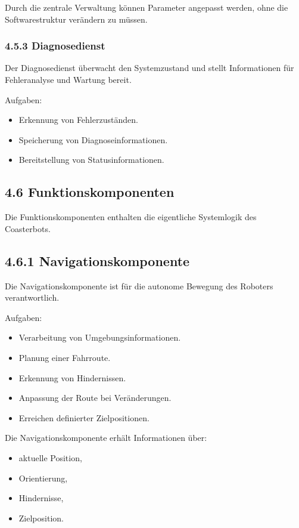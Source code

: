 \documentclass[
  a4paper,
  12pt,
  DIV=12,        %
  parskip=half,  %
  headings=small %
]{scrartcl}
\theoremstyle{definition}
\providecommand{\tightlist}{%
  \setlength{\itemsep}{0pt}\setlength{\parskip}{0pt}}
\theoremstyle{definition}
\providecommand{\tightlist}{%
  \setlength{\itemsep}{0pt}\setlength{\parskip}{0pt}}
\begin{document}
Durch die zentrale Verwaltung können Parameter angepasst werden, ohne
die Softwarestruktur verändern zu müssen.

\subsubsection{4.5.3 Diagnosedienst}\label{diagnosedienst}

Der Diagnosedienst überwacht den Systemzustand und stellt Informationen
für Fehleranalyse und Wartung bereit.

Aufgaben:

\begin{itemize}
\tightlist
\item
  Erkennung von Fehlerzuständen.
\item
  Speicherung von Diagnoseinformationen.
\item
  Bereitstellung von Statusinformationen.
\end{itemize}

\subsection{4.6 Funktionskomponenten}\label{funktionskomponenten}

Die Funktionskomponenten enthalten die eigentliche Systemlogik des
Coasterbots.

\subsection{4.6.1 Navigationskomponente}\label{navigationskomponente-1}

Die Navigationskomponente ist für die autonome Bewegung des Roboters
verantwortlich.

Aufgaben:

\begin{itemize}
\tightlist
\item
  Verarbeitung von Umgebungsinformationen.
\item
  Planung einer Fahrroute.
\item
  Erkennung von Hindernissen.
\item
  Anpassung der Route bei Veränderungen.
\item
  Erreichen definierter Zielpositionen.
\end{itemize}

Die Navigationskomponente erhält Informationen über:

\begin{itemize}
\tightlist
\item
  aktuelle Position,
\item
  Orientierung,
\item
  Hindernisse,
\item
  Zielposition.
\end{itemize}
\end{document}
